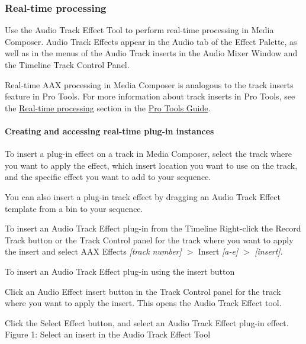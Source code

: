 \hypertarget{a00361_subsection__real-time_processing}{}\subsubsection{Real-\/time processing}\label{a00361_subsection__real-time_processing}
 Use the Audio Track Effect Tool to perform real-\/time processing in Media Composer. Audio Track Effects appear in the Audio tab of the Effect Palette, as well as in the menus of the Audio Track inserts in the Audio Mixer Window and the Timeline Track Control Panel.

Real-\/time A\+A\+X processing in Media Composer is analogous to the track inserts feature in Pro Tools. For more information about track inserts in Pro Tools, see the \hyperlink{a00360_subsection__realtime_processing}{Real-\/time processing} section in the \hyperlink{a00360}{Pro Tools Guide}.

\hypertarget{a00361_subsubsectin__media_composer_guide__inserting_real-time}{}\paragraph{Creating and accessing real-\/time plug-\/in instances}\label{a00361_subsubsectin__media_composer_guide__inserting_real-time}
 To insert a plug-\/in effect on a track in Media Composer, select the track where you want to apply the effect, which insert location you want to use on the track, and the specific effect you want to add to your sequence.

You can also insert a plug-\/in track effect by dragging an Audio Track Effect template from a bin to your sequence.

To insert an Audio Track Effect plug-\/in from the Timeline  Right-\/click the Record Track button or the Track Control panel for the track where you want to apply the insert and select A\+A\+X Effects {\itshape \mbox{[}track number\mbox{]}} $>$ Insert {\itshape \mbox{[}a-\/e\mbox{]}} $>$ {\itshape \mbox{[}insert\mbox{]}}.

To insert an Audio Track Effect plug-\/in using the insert button  
\begin{DoxyEnumerate}
\item Click an Audio Effect insert button in the Track Control panel for the track where you want to apply the insert. This opens the Audio Track Effect tool.  
\item Click the Select Effect button, and select an Audio Track Effect plug-\/in effect.   Figure 1\+: Select an insert in the Audio Track Effect Tool  
\end{DoxyEnumerate}

